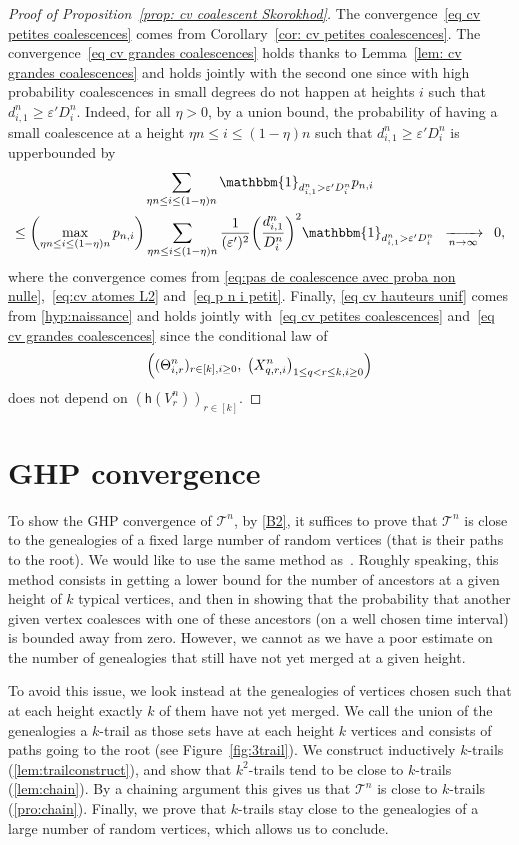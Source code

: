 \documentclass[10pt]{amsart}
\theoremstyle{definition}\newtheorem{defi}[theo]{Definition}\newtheorem{rema}[theo]{Remark}\newtheorem{exam}[theo]{Example}\newtheorem{exem}[theo]{Example}\newtheorem{nota}[theo]{Notation}
\newcommand{\e}{\varepsilon}
\newcommand{\cv}[1][n]{\enskip\xrightarrow[#1 \to \infty]{}\enskip}
\newcommand{\1}{\mathbbm{1}}
\newcommand{\T}{\mathcal{T}}
\newcommand{\h}{\mathsf{h}}
\let\originalleft\left
\let\originalright\right
\renewcommand{\left}{\mathopen{}\mathclose\bgroup\originalleft}
\renewcommand{\right}{\aftergroup\egroup\originalright}
\renewcommand*{\to}{\mathchoice{\longrightarrow}{\rightarrow}{\rightarrow}{\rightarrow}}
\begin{document}
\begin{proof}[Proof of Proposition~\ref{prop: cv coalescent Skorokhod}]
The convergence~\eqref{eq cv petites coalescences} comes from Corollary~\ref{cor: cv petites coalescences}. The convergence~\eqref{eq cv grandes coalescences} holds thanks to Lemma~\ref{lem: cv grandes coalescences} and holds jointly with the second one since with high probability coalescences in small degrees do not happen at heights $i$ such that $d^n_{i,1} \ge \e' D^n_i$. Indeed, for all $\eta>0$, by a union bound, the probability of having a small coalescence at a height $\eta n \le i \le (1-\eta) n$ such that $d^n_{i,1} \ge \e' D^n_i$ is upperbounded by
\begin{multline*}
\sum_{\eta n \le i\le (1-\eta) n} \1_{d^n_{i,1} > \e' D^n_i} p_{n,i}\\
\le
\left(\max_{\eta n \le i \le (1-\eta)n} p_{n,i}\right)
\sum_{\eta n \le i\le (1-\eta) n} \frac{1}{(\e')^2} {\left(\frac{d^n_{i,1}}{{D^n_i}}\right)^2} \1_{d^n_{i,1} > \e' D^n_i}
\cv[n] 0,
\end{multline*}
where the convergence comes from \eqref{eq:pas de coalescence avec proba non nulle},~\eqref{eq:cv atomes L2} and~\eqref{eq p n i petit}. Finally, \eqref{eq cv hauteurs unif} comes from \ref{hyp:naissance} and holds jointly with~\eqref{eq cv petites coalescences} and~\eqref{eq cv grandes coalescences} since the conditional law of
\[
\left((\Theta^n_{i,r})_{r \in [k], i\ge 0},\;\bigl(X^n_{q,r,i}\bigr)_{1 \le q<r \le k, i\ge 0}\right)
\]
does not depend on $(\h(V^n_r))_{r \in [k]}$.
\end{proof}


\section{GHP convergence}\label{sec:proofGHP}
To show the GHP convergence of $\T^n$, by \cref{B2}, it suffices to prove that $\T^n$ is close to the genealogies of a fixed large number of random vertices (that is their paths to the root). We would like to use the same method as~\cite{BBKKbis23+}. {Roughly speaking, this method consists in getting a lower bound for the number of ancestors at a given height of $k$ typical vertices, and then in showing that the probability that another given vertex coalesces with one of these ancestors (on a well chosen time interval) is bounded away from zero.} However, we cannot as we have {a} poor estimate on the number of genealogies that still have not yet merged at {a} given height.

To avoid this issue, we look instead at the genealogies of vertices chosen such that at each height exactly $k$ of them have not yet merged. We call the union of the genealogies a $k$-trail as those sets have at each height $k$ vertices and consists of paths going to the root (see Figure~\ref{fig:3trail}). We construct inductively $k$-trails (\cref{lem:trailconstruct}), and show that $k^2$-trails tend to be close to $k$-trails (\cref{lem:chain}). By a chaining argument this gives us that $\T^n$ is close to $k$-trails (\cref{pro:chain}). Finally, we prove that $k$-trails stay close to the genealogies of a large number of random vertices, which allows us to conclude.
\end{document}

